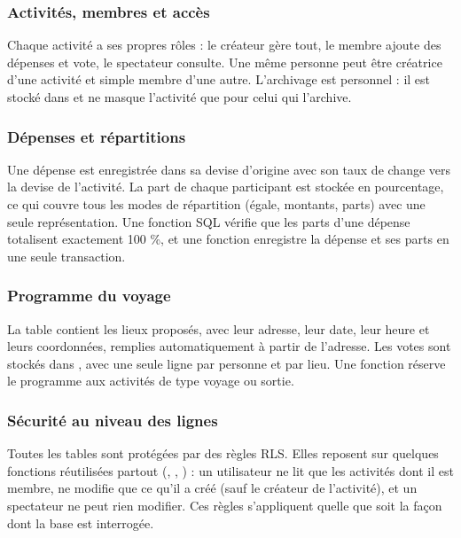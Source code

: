 \subsubsection{Activités, membres et accès}

Chaque activité a ses propres rôles : le créateur gère tout, le membre ajoute des dépenses
et vote, le spectateur consulte. Une même personne peut être créatrice d'une activité et
simple membre d'une autre. L'archivage est personnel : il est stocké dans
 et ne masque l'activité que pour celui qui l'archive.

\subsubsection{Dépenses et répartitions}

Une dépense est enregistrée dans sa devise d'origine avec son taux de change vers la devise
de l'activité. La part de chaque participant est stockée en pourcentage, ce qui couvre tous
les modes de répartition (égale, montants, parts) avec une seule représentation. Une
fonction SQL vérifie que les parts d'une dépense totalisent exactement 100 \%, et une
fonction  enregistre la dépense et ses parts en une seule transaction.

\subsubsection{Programme du voyage}

La table  contient les lieux proposés, avec leur adresse, leur date,
leur heure et leurs coordonnées, remplies automatiquement à partir de l'adresse. Les votes
sont stockés dans , avec une seule ligne par personne et par lieu. Une
fonction  réserve le programme aux activités de type voyage ou sortie.

\subsubsection{Sécurité au niveau des lignes}

Toutes les tables sont protégées par des règles RLS. Elles reposent sur quelques fonctions
réutilisées partout (, , ) : un
utilisateur ne lit que les activités dont il est membre, ne modifie que ce qu'il a créé
(sauf le créateur de l'activité), et un spectateur ne peut rien modifier. Ces règles
s'appliquent quelle que soit la façon dont la base est interrogée.

